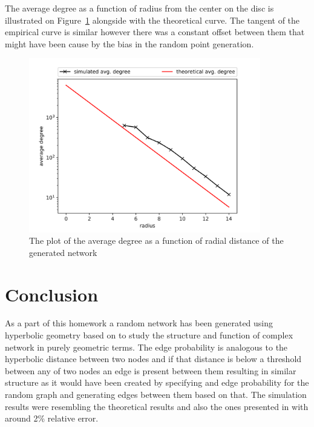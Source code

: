 \documentclass[a4paper]{article}
\begin{document}
The average degree as a function of radius from the center on the disc is illustrated on Figure~\ref{fig:graph_radius} alongside with the theoretical curve. The tangent of the empirical curve is similar however there was a constant offset between them that might have been cause by the bias in the random point generation.

\begin{figure}[H]
    \centering
    \includegraphics[width=0.9\textwidth]{figures/result_graph_radial_stats.png}
    \caption{The plot of the average degree as a function of radial distance of the generated network}
    \label{fig:graph_radius}
\end{figure}




\section{Conclusion}

As a part of this homework a random network has been generated using  hyperbolic geometry based on \cite{HyperbolicGeoNetworks} to study the
structure and function of complex network in purely geometric terms. The edge probability is analogous to the hyperbolic distance between two nodes and if that distance is below a threshold between 
any of two nodes an edge is present between them resulting in similar structure as it would have been created by specifying and edge probability for the random graph and generating edges between them based on that.
The simulation results were resembling the theoretical results and also the ones presented in \cite{HyperbolicGeoNetworks} with around 2\% relative error.




\end{document}
